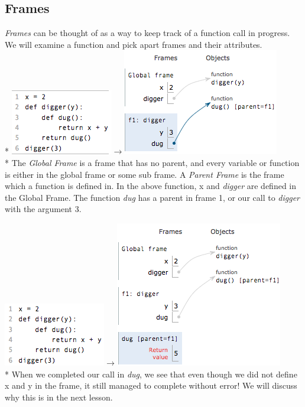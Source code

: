\documentclass{article}
\begin{document}
\subsection{Frames}
\emph{Frames} can be thought of as a way to keep track of a function call in progress. We will examine a function and pick apart frames and their attributes.
\\* 
\includegraphics[scale=.7]{../images/dug1.png}{\Huge $\rightarrow$}\includegraphics[scale=.7]{../images/dug2.png} \\* \bigskip
 The \emph{Global Frame} is a frame that has no parent, and every variable or function is either in the global frame or some sub frame. A \emph{Parent Frame} is the frame which a function is defined in. In the above function, x and \emph{digger} are defined in the Global Frame. The function \emph{dug} has a parent in frame 1, or our call to \emph{digger} with the argument 3. 
 
 \includegraphics[scale=.7]{../images/dug3.png}{\Huge $\rightarrow$}\includegraphics[scale=.7]{../images/dug4.png} \\* \bigskip
 When we completed our call in \emph{dug}, we see that even though we did not define x and y in the frame, it still managed to complete without error! We will discuss why this is in the next lesson. 
\end{document}
